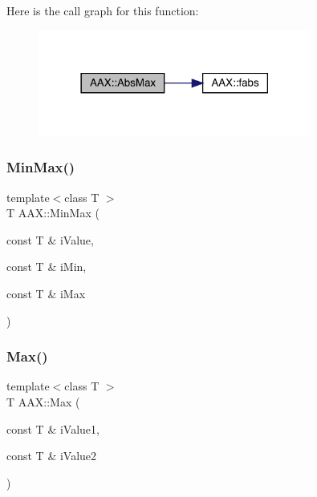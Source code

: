 Here is the call graph for this function\+:
\nopagebreak
\begin{figure}[H]
\begin{center}
\leavevmode
\includegraphics[width=254pt]{a00852_aa4cbb7d8707ad89fc5ba5169ebb75201_cgraph}
\end{center}
\end{figure}
\mbox{\label{a00852_aca59c4cdf56130ee251118c02a9963e3}} 
\subsubsection{\texorpdfstring{MinMax()}{MinMax()}}
{\footnotesize\ttfamily template$<$class T $>$ \\
T A\+A\+X\+::\+Min\+Max (\begin{DoxyParamCaption}\item[{const T \&}]{i\+Value,  }\item[{const T \&}]{i\+Min,  }\item[{const T \&}]{i\+Max }\end{DoxyParamCaption})\hspace{0.3cm}{\ttfamily [inline]}}

\mbox{\label{a00852_a55ac62cf1b543338c58f8dd0d747c56c}} 
\subsubsection{\texorpdfstring{Max()}{Max()}}
{\footnotesize\ttfamily template$<$class T $>$ \\
T A\+A\+X\+::\+Max (\begin{DoxyParamCaption}\item[{const T \&}]{i\+Value1,  }\item[{const T \&}]{i\+Value2 }\end{DoxyParamCaption})\hspace{0.3cm}{\ttfamily [inline]}}

\mbox{\label{a00852_a38c17ad30c1eb394bfa06e662d8d2598}} 
